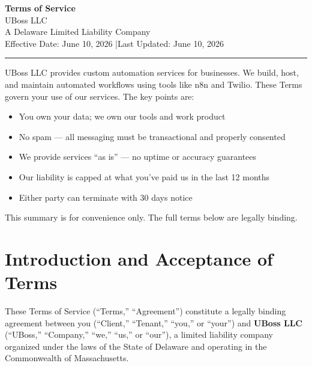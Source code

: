 \documentclass[11pt,letterpaper,parskip=half]{scrartcl}
\begin{document}
\begin{center}
    {\LARGE\bfseries\color{charcoal}Terms of Service}\\[0.4em]
    {\large\color{accent}UBoss LLC}\\[0.3em]
    {\small A Delaware Limited Liability Company}\\[0.2em]
    {\small Effective Date: June 10, 2026 \quad|\quad Last Updated: June 10, 2026}\\[0.5em]
    \textcolor{ruleline}{\rule{0.5\textwidth}{0.6pt}}
\end{center}

\vspace{0.5em}

\begin{tcolorbox}[keyterm, title={Plain-Language Summary}]
UBoss LLC provides custom automation services for businesses. We build, host, and maintain automated workflows using tools like n8n and Twilio. These Terms govern your use of our services. The key points are:
\begin{itemize}[nosep, leftmargin=1.5em]
    \item You own your data; we own our tools and work product
    \item No spam --- all messaging must be transactional and properly consented
    \item We provide services ``as is'' --- no uptime or accuracy guarantees
    \item Our liability is capped at what you've paid us in the last 12 months
    \item Either party can terminate with 30 days notice
\end{itemize}
This summary is for convenience only. The full terms below are legally binding.
\end{tcolorbox}

\vspace{0.5em}
\tableofcontents
\newpage

\section{Introduction and Acceptance of Terms}

These Terms of Service (``Terms,'' ``Agreement'') constitute a legally binding agreement between you (``Client,'' ``Tenant,'' ``you,'' or ``your'') and \textbf{UBoss LLC} (``UBoss,'' ``Company,'' ``we,'' ``us,'' or ``our''), a limited liability company organized under the laws of the State of Delaware and operating in the Commonwealth of Massachusetts.
\end{document}
